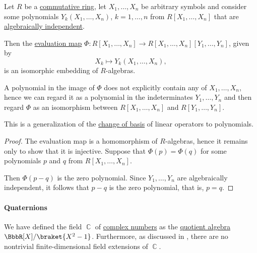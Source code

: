 \begin{proposition}\label{thm:change_of_polynomial_basis}
  Let \( R \) be a \hyperref[def:ring/commutative]{commutative ring}, let \( X_1, \ldots, X_n \) be arbitrary symbols and consider some polynomials \( Y_k(X_1, \ldots, X_n) \), \( k = 1, \ldots, n \) from \( R[X_1, \ldots, X_n] \) that are \hyperref[def:algebraic_dependence]{algebraically independent}.

  Then the \hyperref[thm:polynomial_algebra_universal_property]{evaluation map} \( \Phi: R[X_1, \ldots, X_n] \to R[X_1, \ldots, X_n][Y_1, \ldots, Y_n] \), given by
  \begin{equation*}
    X_k \mapsto Y_k(X_1, \ldots, X_n),
  \end{equation*}
  is an isomorphic embedding of \( R \)-algebras.
\end{proposition}
\begin{comments}
  \item A polynomial in the image of \( \Phi \) does not explicitly contain any of \( X_1, \ldots, X_n \), hence we can regard it as a polynomial in the indeterminates \( Y_1, \ldots, Y_n \) and then regard \( \Phi \) as an isomorphism between \( R[X_1, \ldots, X_n] \) and \( R[Y_1, \ldots, Y_n] \).

  \item This is a generalization of the \hyperref[con:change_of_basis]{change of basis} of linear operators to polynomials.
\end{comments}
\begin{proof}
  The evaluation map is a homomorphism of \( R \)-algebras, hence it remains only to show that it is injective. Suppose that \( \Phi(p) = \Phi(q) \) for some polynomials \( p \) and \( q \) from \( R[X_1, \ldots, X_n] \).

  Then \( \Phi(p - q) \) is the zero polynomial. Since \( Y_1, \ldots, Y_n \) are algebraically independent, it follows that \( p - q \) is the zero polynomial, that is, \( p = q \).
\end{proof}

\paragraph{Quaternions}\hfill

We have defined the field \( \BbbC \) of \hyperref[def:complex_numbers]{complex numbers} as the \hyperref[def:algebra_over_ring/quotient]{quotient algebra} \( \BbbR[X] / \braket{ X^2 - 1 } \). Furthermore, as discussed in , there are no nontrivial finite-dimensional field extensions of \( \BbbC \).

